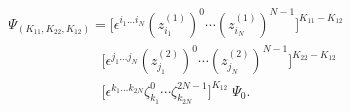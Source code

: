 \begin{equation}
\begin{array}{l}
\Psi_{(K_{11},K_{22},K_{12})}=
\bigl[ \epsilon ^{i_1...i_N}  (z_{i_1}^{(1)})^0 \cdots
(z_{i_N}^{(1)})^{N-1} \bigr]^{K_{11}-K_{12}}\\
\qquad \qquad  \qquad\ \ \ 
\bigl[ \epsilon ^{j_1...j_N}  (z_{j_1}^{(2)})^0 \cdots
(z_{j_N}^{(2)})^{N-1} \bigr]^{K_{22}-K_{12}}\\
\qquad\qquad \qquad \ \ \ 
\bigl[ \epsilon ^{k_1...k_{2N}}  \zeta_{k_1}^0 \cdots
\zeta_{k_{2N}}^{2N-1} \bigr]^{K_{12}}\; 
\Psi_{0}.
\end{array}
\end{equation}

